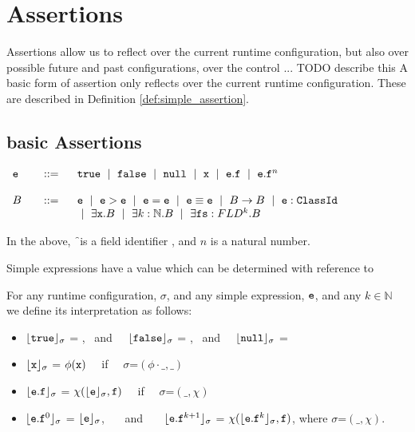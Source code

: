 \section{ Assertions}

Assertions allow us to reflect over the current runtime configuration, but also over possible future and past configurations, over 
the control ... TODO describe this
A basic form of assertion only reflects over the current runtime configuration. These are described in Definition \ref{def:simple_assertion}.
 
 \subsection{basic Assertions}
 \label{def:basic_assertion}
 \begin{definition} $ $ \\
 
 $\begin{array}{lcl}
 \SE & ::= &  \prg{true}  \ \mid\ \prg{false}  \    \mid\ \prg{null}  \ \mid \ \x  \ \mid \ \SE.\f    \ \mid \ \SE.\f^n \  \\
 ~ \\
  \SA\ &\ \  ::=\ \  & \SE  \ \mid \ \SE > \SE \ \mid \  \SE=\SE  \ \mid \ \SE \equiv \SE \ \mid  \ \SA \rightarrow \SA \ \mid \   \SE:\prg{ClassId}  %
  \\  & &   
\ \mid \   \exists \prg{x}.\SA   %
  \ \mid \  \exists k:\mathbb{N}.\SA  
  \ \mid \  \exists \prg{fs}:FLD^k.\SA
\end{array}$

\noindent
In the above, \f\  is a field identifier , and  $n$ is a natural number.
\end{definition} 

Simple expressions have a value which can be determined with reference to 

\begin{definition}[Interpretations]

For any runtime configuration, $\sigma$, and any simple expression, ${\mbox{\tt{e}}}$, and any $k\in \mathbb{N}$ we define its interpretation as follows:

\begin{itemize}
     \item 
  ${\lfloor{ {{\mbox{\tt{true}}}}}\rfloor_{\sigma}}$ = , \ and \ \    ${\lfloor{ {{\mbox{\tt{false}}}}}\rfloor_{\sigma}}$ = , \ and \ \ 
   $\interp {}{\sigma}$ = \prg{null}
  \item
  ${\lfloor{ {{\mbox{\tt{x}}}}}\rfloor_{\sigma}}$ = $\phi({\mbox{\tt{x}}})$  \ \ if \ \ $\sigma$=$(\phi\cdot\_,\_)$
  \item
  ${\lfloor{ {\ensuremath{{\mbox{\tt{e}}}}.{\mbox{\tt{f}}}}}\rfloor_{\sigma}}$ = $\chi({{\lfloor{ {\ensuremath{{\mbox{\tt{e}}}}}}\rfloor_{\sigma}}}, {\mbox{\tt{f}}})$  \ \ if \ \ $\sigma$=$(\_,\chi)$
   \item
     ${\lfloor{ {\ensuremath{{\mbox{\tt{e}}}}.{\mbox{\tt{f}}}^0}}\rfloor_{\sigma}}$ =  ${\lfloor{ {\ensuremath{{\mbox{\tt{e}}}}}}\rfloor_{\sigma}}$, \ \ \ and \ \ \ ${\lfloor{ {\ensuremath{{\mbox{\tt{e}}}}.{\mbox{\tt{f}}}^{k+1}}}\rfloor_{\sigma}}$ =  $\chi({{\lfloor{ {\ensuremath{{\mbox{\tt{e}}}}.{\mbox{\tt{f}}}^k}}\rfloor_{\sigma}}}, {\mbox{\tt{f}}})$, where $\sigma$=$(\_,\chi)$.
   \end{itemize}
\end{definition}

